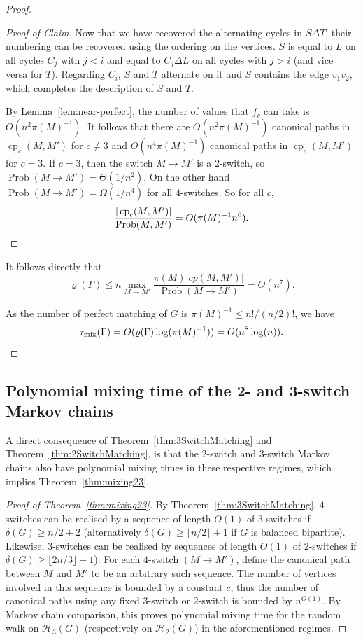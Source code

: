 \documentclass[11pt,a4paper]{article}
\theoremstyle{definition}
\newenvironment{poc}{\begin{proof}[Proof of
    Claim]\renewcommand*{\qedsymbol}{$\blacksquare$}}{\end{proof}}
\DeclareMathOperator{\cp}{cp}
\DeclareMathOperator{\Prob}{Prob}
\DeclareMathOperator{\mix}{mix}
\begin{document}
\begin{proof}
\begin{poc}
    Now that we have recovered the alternating cycles in $S \Delta T$,
    their numbering can be recovered using the ordering on the vertices. $S$ is
    equal to $L$ on all cycles $C_j$ with $j < i$ and equal to $C_j \Delta L$ on
    all cycles with $j > i$ (and vice versa for $T$). Regarding $C_i$, $S$ and
    $T$ alternate on it and $S$ contains the edge $v_1v_2$, which completes the
    description of $S$ and $T$.

    By Lemma~\ref{lem:near-perfect}, the number of values that $f_c$ can take is
    $O(n^2\pi(M)^{-1})$. It follows that there are $O(n^2\pi(M)^{-1})$ canonical paths in
    $\cp_c(M,M')$ for $c\neq 3$ and $O(n^4\pi(M)^{-1})$ canonical paths in
    $\cp_c(M,M')$ for $c = 3$. If $c=3$, then the switch $M \to M'$ is a
    $2$-switch, so $\Prob(M \to M') = \Theta(1/n^2)$. On the other hand $\Prob(M
    \to M') = \Omega(1/n^4)$ for all $4$-switches. So for all $c$,
    \[\frac{|\cp_c(M,M')|}{\Prob(M,M')} = O(\pi(M)^{-1}n^6).\qedhere \]
  \end{poc}
  It follows directly that 
    $$\varrho(\Gamma) \le n \max_{M \rightarrow M'} \frac{\pi(M)|cp(M,M')|}{\Prob(M\rightarrow
      M')} = O(n^7).$$

  As the number of perfect matching of $G$ is $\pi(M)^{-1} \le n!/(n/2)!$, we have
  \[\tau_{\mix}(\Gamma) = O(\varrho(\Gamma)\log(\pi(M)^{-1})) = O(n^8\log(n)).\qedhere\]
\end{proof}

\subsection{Polynomial mixing time of the 2- and 3-switch Markov chains}\label{ssec:mixing23}

A direct consequence of Theorem~\ref{thm:3SwitchMatching} and
Theorem~\ref{thm:2SwitchMatching}, is that the $2$-switch and $3$-switch Markov chains also
have polynomial mixing times in these respective regimes, which implies
Theorem~\ref{thm:mixing23}.


\begin{proof}[Proof of Theorem~\ref{thm:mixing23}]
  By Theorem~\ref{thm:3SwitchMatching}, $4$-switches can
  be realised by a sequence of length $O(1)$ of $3$-switches if
  $\delta(G)\ge n/2 +2$ (alternatively $\delta(G) \ge \lfloor n/2\rfloor+1$ if $G$ is balanced bipartite). Likewise, $3$-switches can be realised by sequences of length $O(1)$ of $2$-switches if $\delta(G)
  \ge \lfloor 2n/3\rfloor+1$). For each
  $4$-switch $(M \to M')$, define the canonical path between $M$ and $M'$ to be an
  arbitrary such sequence. The number of vertices involved in this sequence is
  bounded by a constant $c$, thus the number of canonical paths using any fixed
  $3$-switch or $2$-switch is bounded by $n^{O(1)}$. By Markov chain comparison,
  this proves polynomial mixing time for the random walk on $\mathcal H_3(G)$
  (respectively on $\mathcal H_2(G)$) in the aforementioned regimes.
\end{proof}
\end{document}
